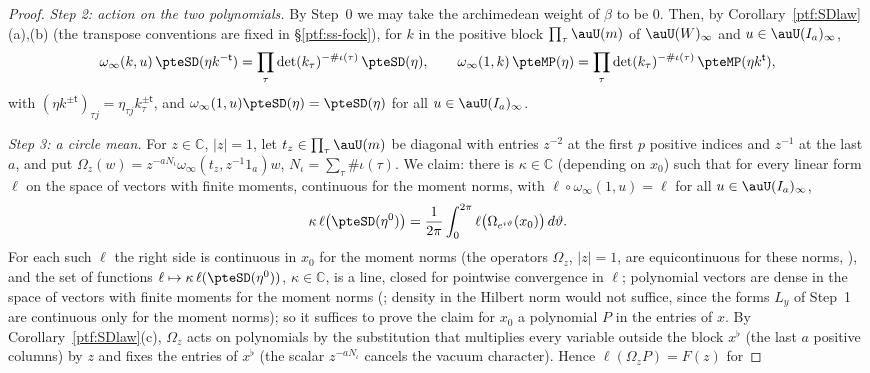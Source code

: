 \documentclass[10pt]{amsart}
\theoremstyle{definition}
\theoremstyle{remark}
\newcommand{\C}{\mathbb C}
\begin{document}
\begin{proof}
\emph{Step 2: action on the two polynomials.} By Step~0 we may take the archimedean weight of $\beta$ to be $0$.
Then, by Corollary~\ref{ptf:SDlaw}(a),(b) (the transpose conventions are fixed in \S\ref{ptf:ss-fock}), for $k$ in the
positive block $\prod_\tau\auU(m)$ of $\auU(W)_\infty$ and $u\in\auU(I_a)_\infty$,
\begin{equation}\label{pte:eq-SDlaw}
\omega_\infty(k,u)\,\pteSD(\eta k^{-\mathsf t})=\prod_\tau\det(k_\tau)^{-\#\iota(\tau)}\,\pteSD(\eta),
\qquad
\omega_\infty(1,k)\,\pteMP(\eta)=\prod_\tau\det(k_\tau)^{-\#\iota(\tau)}\,\pteMP(\eta k^{\mathsf t}),
\end{equation}
with $(\eta k^{\pm\mathsf t})_{\tau j}=\eta_{\tau j}k_\tau^{\pm\mathsf t}$, and $\omega_\infty(1,u)\pteSD(\eta)=\pteSD(\eta)$ for all
$u\in\auU(I_a)_\infty$.

\emph{Step 3: a circle mean.} For $z\in\C$, $|z|=1$, let $t_z\in\prod_\tau\auU(m)$ be diagonal with
entries $z^{-2}$ at the first $p$ positive indices and $z^{-1}$ at the last $a$, and put
$\Omega_z(w)=z^{-aN_\iota}\omega_\infty(t_z,z^{-1}1_a)w$, $N_\iota=\sum_\tau\#\iota(\tau)$. We claim:
there is $\kappa\in\C$ (depending on $x_0$) such that for every linear form $\ell$ on the
space of vectors with finite moments, continuous for the moment norms, with $\ell\circ\omega_\infty(1,u)=\ell$ for all $u\in\auU(I_a)_\infty$,
\begin{equation}\label{pte:eq-circle}
\kappa\,\ell\bigl(\pteSD(\eta^0)\bigr)=\frac1{2\pi}\int_0^{2\pi}\ell\bigl(\Omega_{e^{i\vartheta}}(x_0)
\bigr)\,d\vartheta .
\end{equation}
For each such $\ell$ the right side is continuous in $x_0$ for the moment norms (the operators $\Omega_z$, $|z|=1$, are equicontinuous for
these norms, {\cite[Lemma~3.108(i)]{P53}}), and the set of
functions $\ell\mapsto\kappa\,\ell(\pteSD(\eta^0))$, $\kappa\in\C$, is a line, closed for pointwise convergence in $\ell$; polynomial vectors are
dense in the space of vectors with finite moments for the moment norms ({\cite[Lemma~3.107(b)]{P53}}; density in the Hilbert norm would not suffice, since the forms $L_y$ of Step~1 are continuous only for the moment norms); so it suffices to prove the claim for $x_0$ a polynomial $P$ in the
entries of $x$. By Corollary~\ref{ptf:SDlaw}(c), $\Omega_z$ acts on polynomials by the substitution that multiplies every
variable outside the block $x^\flat$ (the last $a$ positive columns) by $z$ and fixes the entries of
$x^\flat$ (the scalar $z^{-aN_\iota}$ cancels the vacuum character). Hence $\ell(\Omega_z P)=F(z)$ for

\end{proof}
\end{document}
